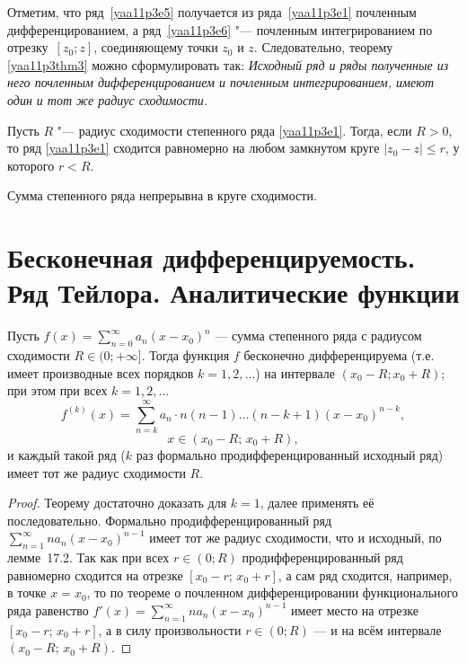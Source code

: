 \begin{notion}
    Отметим, что ряд~\eqref{yaa11p3e5} получается из ряда~\eqref{yaa11p3e1} почленным дифференцированием, а ряд~\eqref{yaa11p3e6} "--- почленным интегрированием по отрезку~$[z_0;z]$, соединяющему точки $z_0$ и $z$. Следовательно, теорему \eqref{yaa11p3thm3} можно сформулировать так:
\textit{Исходный ряд и ряды полученные из него почленным дифференцированием и почленным интегрированием, имеют один и тот же радиус сходимости.}
\end{notion}

\begin{thm} \label{yaa11p3thm4}
Пусть $R$ "--- радиус сходимости степенного ряда \eqref{yaa11p3e1}. Тогда, если $R>0$, то ряд \eqref{yaa11p3e1} сходится равномерно на любом замкнутом круге $|z_0-z|\le r$, у которого $r<R$.
\end{thm}

\begin{cons}
Сумма степенного ряда непрерывна в круге сходимости.
\end{cons}

\section{Бесконечная дифференцируемость. Ряд Тейлора. Аналитические функции}
\begin{thm} \label{ch13.4thm0}
Пусть $f(x) = \sum\limits_{n=0}^{\infty} a_n (x - x_0)^n$ — сумма степенного ряда 
с радиусом сходимости $R \in (0; +\infty]$. Тогда функция $f$ бесконечно 
дифференцируема (т.е. имеет производные всех порядков $k = 1, 2, \ldots$) 
на интервале $(x_0 - R; x_0 + R)$; при этом при всех $k = 1, 2, \ldots$
\[
f^{(k)}(x) = \sum_{n=k}^{\infty} a_n \cdot n(n-1) \ldots (n - k + 1)(x - x_0)^{n-k},
\]
\[
x \in (x_0 - R;\, x_0 + R),
\]
и каждый такой ряд ($k$ раз формально продифференцированный исходный ряд) 
имеет тот же радиус сходимости $R$.
\end{thm}

\begin{proof}
Теорему достаточно доказать для $k = 1$, далее применять её последовательно. 
Формально продифференцированный ряд $\sum\limits_{n=1}^{\infty} n a_n (x - x_0)^{n-1}$ 
имеет тот же радиус сходимости, что и исходный, по лемме~17.2. Так как при всех 
$r \in (0; R)$ продифференцированный ряд равномерно сходится на отрезке 
$[x_0 - r;\, x_0 + r]$, а сам ряд сходится, например, в точке $x = x_0$, то по 
теореме о почленном дифференцировании функционального ряда равенство 
$f'(x) = \sum\limits_{n=1}^{\infty} n a_n (x - x_0)^{n-1}$ имеет место на отрезке 
$[x_0 - r;\, x_0 + r]$, а в силу произвольности $r \in (0; R)$ — и на всём 
интервале $(x_0 - R;\, x_0 + R)$. 
\end{proof}

